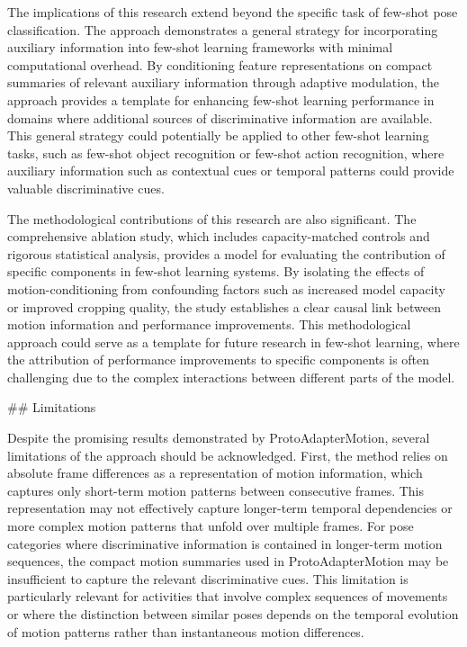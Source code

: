 \documentclass[11pt]{article}
\begin{document}
The implications of this research extend beyond the specific task of few-shot pose classification. The approach demonstrates a general strategy for incorporating auxiliary information into few-shot learning frameworks with minimal computational overhead. By conditioning feature representations on compact summaries of relevant auxiliary information through adaptive modulation, the approach provides a template for enhancing few-shot learning performance in domains where additional sources of discriminative information are available. This general strategy could potentially be applied to other few-shot learning tasks, such as few-shot object recognition or few-shot action recognition, where auxiliary information such as contextual cues or temporal patterns could provide valuable discriminative cues.

The methodological contributions of this research are also significant. The comprehensive ablation study, which includes capacity-matched controls and rigorous statistical analysis, provides a model for evaluating the contribution of specific components in few-shot learning systems. By isolating the effects of motion-conditioning from confounding factors such as increased model capacity or improved cropping quality, the study establishes a clear causal link between motion information and performance improvements. This methodological approach could serve as a template for future research in few-shot learning, where the attribution of performance improvements to specific components is often challenging due to the complex interactions between different parts of the model.

## Limitations

Despite the promising results demonstrated by ProtoAdapterMotion, several limitations of the approach should be acknowledged. First, the method relies on absolute frame differences as a representation of motion information, which captures only short-term motion patterns between consecutive frames. This representation may not effectively capture longer-term temporal dependencies or more complex motion patterns that unfold over multiple frames. For pose categories where discriminative information is contained in longer-term motion sequences, the compact motion summaries used in ProtoAdapterMotion may be insufficient to capture the relevant discriminative cues. This limitation is particularly relevant for activities that involve complex sequences of movements or where the distinction between similar poses depends on the temporal evolution of motion patterns rather than instantaneous motion differences.
\end{document}
